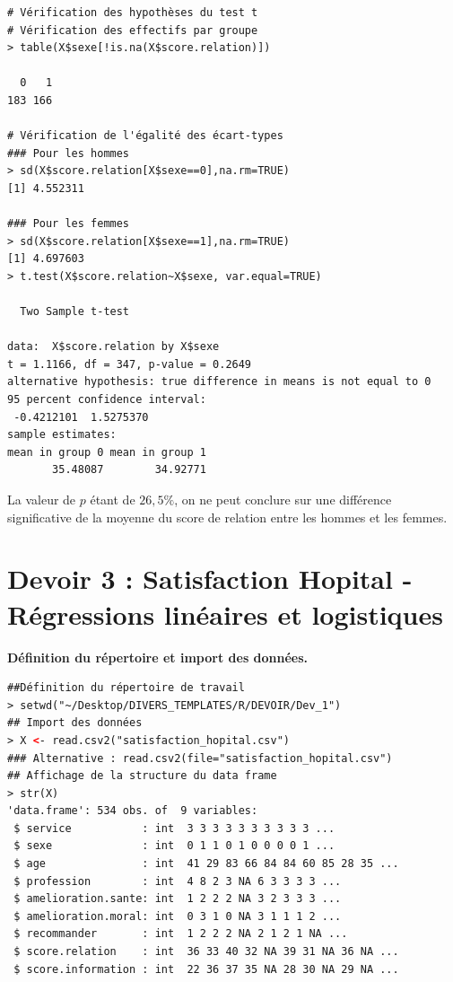 \begin{lstlisting}[language=html]
# Vérification des hypothèses du test t
# Vérification des effectifs par groupe
> table(X$sexe[!is.na(X$score.relation)])

  0   1 
183 166 

# Vérification de l'égalité des écart-types
### Pour les hommes
> sd(X$score.relation[X$sexe==0],na.rm=TRUE)
[1] 4.552311

### Pour les femmes
> sd(X$score.relation[X$sexe==1],na.rm=TRUE)
[1] 4.697603
> t.test(X$score.relation~X$sexe, var.equal=TRUE)

  Two Sample t-test

data:  X$score.relation by X$sexe
t = 1.1166, df = 347, p-value = 0.2649
alternative hypothesis: true difference in means is not equal to 0
95 percent confidence interval:
 -0.4212101  1.5275370
sample estimates:
mean in group 0 mean in group 1 
       35.48087        34.92771 

\end{lstlisting}

La valeur de $p$ étant de $26,5\%$, on ne peut conclure sur une différence significative de la moyenne du score de relation entre les hommes et les femmes.


\newpage

\section{Devoir 3 : Satisfaction Hopital - Régressions linéaires et logistiques}

\textbf{Définition du répertoire et import des données.}

\begin{lstlisting}[language=html]
##Définition du répertoire de travail 
> setwd("~/Desktop/DIVERS_TEMPLATES/R/DEVOIR/Dev_1")
## Import des données 
> X <- read.csv2("satisfaction_hopital.csv")
### Alternative : read.csv2(file="satisfaction_hopital.csv")
## Affichage de la structure du data frame
> str(X)
'data.frame': 534 obs. of  9 variables:
 $ service           : int  3 3 3 3 3 3 3 3 3 3 ...
 $ sexe              : int  0 1 1 0 1 0 0 0 0 1 ...
 $ age               : int  41 29 83 66 84 84 60 85 28 35 ...
 $ profession        : int  4 8 2 3 NA 6 3 3 3 3 ...
 $ amelioration.sante: int  1 2 2 2 NA 3 2 3 3 3 ...
 $ amelioration.moral: int  0 3 1 0 NA 3 1 1 1 2 ...
 $ recommander       : int  1 2 2 2 NA 2 1 2 1 NA ...
 $ score.relation    : int  36 33 40 32 NA 39 31 NA 36 NA ...
 $ score.information : int  22 36 37 35 NA 28 30 NA 29 NA ...
\end{lstlisting}


